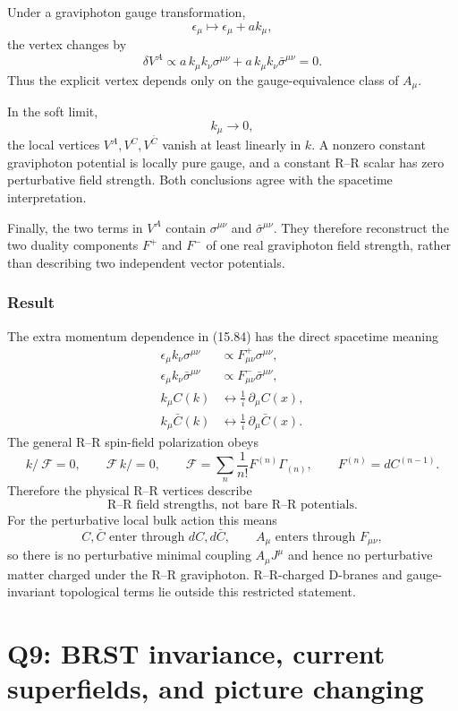 \documentclass[
  10pt,
  a4paper,
  openany]{book}
\begin{document}
Under a graviphoton gauge transformation, \[
\epsilon_\mu\mapsto\epsilon_\mu+a k_\mu,
\] the vertex changes by \[
\delta V^A
\propto
a\,k_\mu k_\nu\sigma^{\mu\nu}
+a\,k_\mu k_\nu\bar\sigma^{\mu\nu}
=0.
\] Thus the explicit vertex depends only on the gauge-equivalence class
of \(A_\mu\).

In the soft limit, \[
k_\mu\longrightarrow0,
\] the local vertices \(V^A,V^C,V^{\bar C}\) vanish at least linearly in
\(k\). A nonzero constant graviphoton potential is locally pure gauge,
and a constant R--R scalar has zero perturbative field strength. Both
conclusions agree with the spacetime interpretation.

Finally, the two terms in \(V^A\) contain \(\sigma^{\mu\nu}\) and
\(\bar\sigma^{\mu\nu}\). They therefore reconstruct the two duality
components \(F^+\) and \(F^-\) of one real graviphoton field strength,
rather than describing two independent vector potentials.

\subsubsection{Result}\label{result-28}

The extra momentum dependence in (15.84) has the direct spacetime
meaning \[
\boxed{
\begin{aligned}
\epsilon_\mu k_\nu\sigma^{\mu\nu}
&\propto
F^+_{\mu\nu}\sigma^{\mu\nu},
\\
\epsilon_\mu k_\nu\bar\sigma^{\mu\nu}
&\propto
F^-_{\mu\nu}\bar\sigma^{\mu\nu},
\\
k_\mu C(k)
&\longleftrightarrow
\frac1i\,\partial_\mu C(x),
\\
k_\mu\bar C(k)
&\longleftrightarrow
\frac1i\,\partial_\mu\bar C(x).
\end{aligned}
}
\] The general R--R spin-field polarization obeys \[
\boxed{
k\!\!\!/\ \mathcal F=0,
\qquad
\mathcal F\,k\!\!\!/=0,
\qquad
\mathcal F=\sum_n\frac1{n!}F^{(n)}\Gamma_{(n)},
\qquad
F^{(n)}=dC^{(n-1)}.
}
\] Therefore the physical R--R vertices describe \[
\boxed{
\text{R--R field strengths, not bare R--R potentials}.
}
\] For the perturbative local bulk action this means \[
\boxed{
C,\bar C\text{ enter through }dC,d\bar C,
\qquad
A_\mu\text{ enters through }F_{\mu\nu},
}
\] so there is no perturbative minimal coupling \(A_\mu J^\mu\) and
hence no perturbative matter charged under the R--R graviphoton.
R--R-charged D-branes and gauge-invariant topological terms lie outside
this restricted statement.

\section{Q9: BRST invariance, current superfields, and picture
changing}\label{q9-brst-invariance-current-superfields-and-picture-changing}
\end{document}

